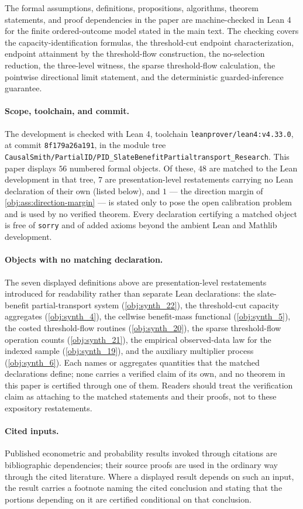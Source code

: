 The formal assumptions, definitions, propositions, algorithms, theorem statements, and
proof dependencies in the paper are machine-checked in Lean 4 for the finite ordered-outcome model
stated in the main text.  The checking covers the capacity-identification formulas, the
threshold-cut endpoint characterization, endpoint attainment by the threshold-flow construction,
the no-selection reduction, the three-level witness, the sparse threshold-flow calculation, the
pointwise directional limit statement, and the deterministic guarded-inference guarantee.

\paragraph{Scope, toolchain, and commit.}
The development is checked with Lean 4, toolchain \texttt{leanprover/lean4:v4.33.0}, at commit
\texttt{8f179a26a191}, in the module tree
\texttt{CausalSmith/PartialID/PID\_SlateBenefitPartialtransport\_Research}.  This paper displays \(56\)
numbered formal objects.  Of these, \(48\) are matched to the Lean development in that tree, \(7\)
are presentation-level restatements carrying no Lean declaration of their own (listed below), and
\(1\) --- the direction margin of \cref{obj:ass:direction-margin} --- is stated only to pose the
open calibration problem and is used by no verified theorem.  Every declaration certifying a
matched object is free of \texttt{sorry} and of added axioms beyond the ambient Lean and Mathlib
development.

\paragraph{Objects with no matching declaration.}
The seven displayed definitions above are presentation-level restatements introduced for readability rather
than separate Lean declarations: the slate-benefit partial-transport system
(\cref{obj:synth_22}), the threshold-cut capacity aggregates (\cref{obj:synth_4}), the cellwise
benefit-mass functional (\cref{obj:synth_5}), the costed threshold-flow routines
(\cref{obj:synth_20}), the sparse threshold-flow operation counts (\cref{obj:synth_21}), the
empirical observed-data law for the indexed sample (\cref{obj:synth_19}), and the auxiliary
multiplier process (\cref{obj:synth_6}).  Each names or aggregates quantities that the matched
declarations define; none carries a verified claim of its own, and no theorem in this paper is
certified through one of them.  Readers should treat the verification claim as attaching to the
matched statements and their proofs, not to these expository restatements.

\paragraph{Cited inputs.}
Published econometric and probability results invoked through citations are bibliographic
dependencies; their source proofs are used in the ordinary way through the cited literature.  Where
a displayed result depends on such an input, the result carries a footnote naming the cited
conclusion and stating that the portions depending on it are certified conditional on that
conclusion.
